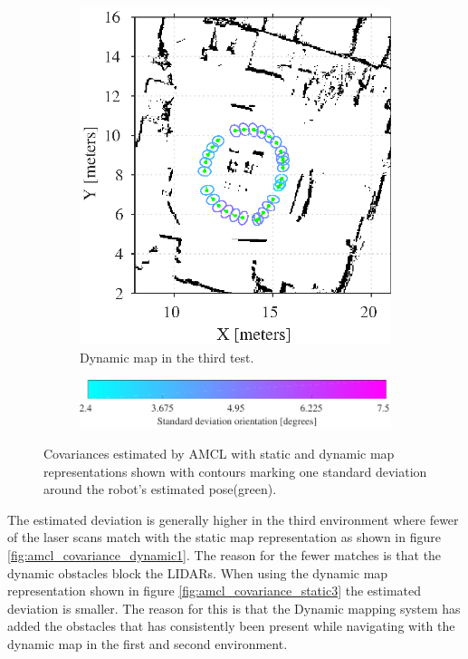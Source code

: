 \begin{figure}[htbp]
\begin{subfigure}[t]{0.45\linewidth}
        \includegraphics[width=\linewidth]{chapters/evaluation/figures/localization_dynamic_map3}
        \caption{Dynamic map in the third test.}
        \label{fig:amcl_covariance_dynamic3}
    \end{subfigure}
    
	\begin{subfigure}[t]{1.0\linewidth}
        \centering
        \hspace{9mm}
		\includegraphics[scale=1]{chapters/evaluation/figures/precision_bar-crop}
	\end{subfigure}
   	\caption{Covariances estimated by AMCL with static and dynamic map representations shown with contours marking one standard deviation around the robot's estimated pose(green).}
\end{figure}

The estimated deviation is generally higher in the third environment where fewer of the laser scans match with the static map representation as shown in figure \ref{fig:amcl_covariance_dynamic1}. 
The reason for the fewer matches is that the dynamic obstacles block the LIDARs. 
When using the dynamic map representation shown in figure \ref{fig:amcl_covariance_static3} the estimated deviation is smaller. 
The reason for this is that the Dynamic mapping system has added the obstacles that has consistently been present while navigating with the dynamic map in the first and second environment.


